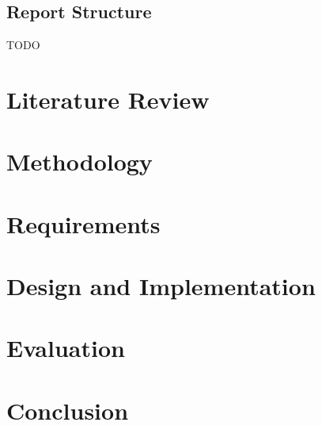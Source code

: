 \documentclass{UoYCSproject}
\begin{document}
\section{Report Structure}
TODO

\chapter{Literature Review}

\chapter{Methodology}

\chapter{Requirements}

\chapter{Design and Implementation}

\chapter{Evaluation}

\chapter{Conclusion}

\printbibliography
\end{document}
